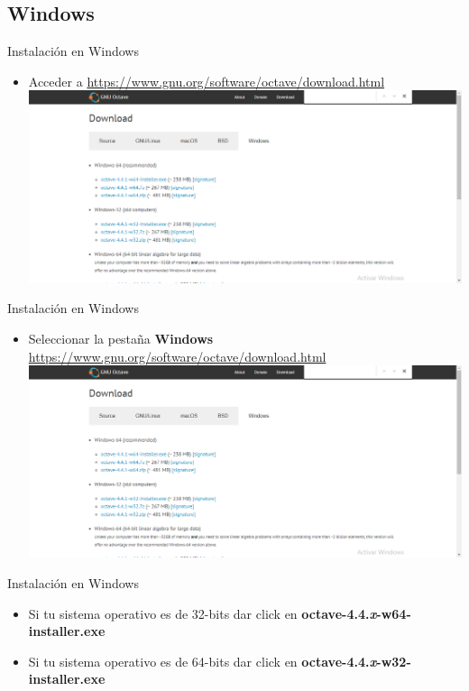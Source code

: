 \documentclass[12pt]{beamer}
\begin{document}
\subsection{Windows}
\begin{frame}{Instalación en Windows}
\begin{itemize}
	\item Acceder a \href{https://www.gnu.org/software/octave/download.html}{https://www.gnu.org/software/octave/download.html}
	\includegraphics[scale=0.3]{images/imagen_octave}	
\end{itemize}
\end{frame}
\begin{frame}{Instalación en Windows}
\begin{itemize}
	\item Seleccionar la pestaña \textbf{Windows} \href{https://www.gnu.org/software/octave/download.html}{https://www.gnu.org/software/octave/download.html}
	\includegraphics[scale=0.3]{images/imagen_octave}	
\end{itemize}
\end{frame}
\begin{frame}{Instalación en Windows}
\begin{itemize}
	\item Si tu sistema operativo es de 32-bits dar click en \textbf{octave-4.4.\textit{x}-w64-installer.exe}
	\item Si tu sistema operativo es de 64-bits dar click en \textbf{octave-4.4.\textit{x}-w32-installer.exe}
\end{itemize}
\end{frame}
\end{document}
